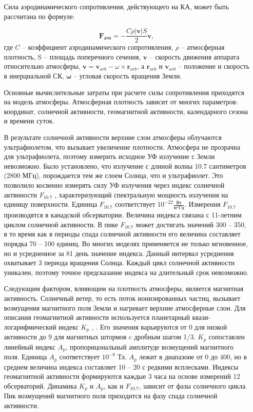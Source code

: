 Сила аэродинамического сопротивления, действующего на КА, может быть рассчитана по формуле:

\begin{equation*}
    \mathbf{F}_{\text{атм}} = - \frac{C \rho |\mathbf{v}| S}{2} \mathbf{v},
\end{equation*}
где $C$ -- коэффициент аэродинамического сопротивления, $\rho$ -- атмосферная плотность, 
S -- площадь поперечного сечения, 
$\mathbf{v}$ -- скорость движения аппарата относительно атмосферы, 
$\mathbf{v} = \mathbf{v}_{orb} - \textbf{$\omega$} \times \mathbf{r}_{orb}$, а
$\mathbf{r}_{orb}$ и $\mathbf{v}_{orb}$  -- положение и скорость в инерциальной СК,
$\mathbf{\omega}$ -- угловая скорость вращения Земли.

Основные вычислительные затраты при расчете силы сопротивления приходятся на модель атмосферы.
Атмосферная плотность зависит от многих параметров: координат, солнечной активности,
геомагнитной активности, календарного сезона и времени суток.

В результате солнечной активности верхние слои атмосферы облучаются ультрафиолетом,
что вызывает увеличение плотности. Атмосфера не прозрачна для ультрафиолета,
поэтому измерить исходное УФ излучение с Земли невозможно. Было установлено, что
излучение с длиной волны 10.7 сантиметров (2800 МГц), порождается тем же слоем Солнца, что и
ультрафиолет. Это позволило косвенно измерять силу УФ излучения через индекс
солнечной актвиности $F_{10.7}$ \cite{Tapping2013}, характеризующий спектральную мощность излучения на единицу поверхности. Единица $F_{10.7}$ соответствует
$10^{-22} \frac{\text{Вт}}{\text{м}^2 \text{Гц}}$. 
Измерения $F_{10.7}$ производятся в канадской обсерватории. 
Величина индекса связана с 11-летним циклом солнечной активности. 
В пике $F_{10.7}$ может достигать значений 300 -- 350, в то время как в периоды спада
солнечной активности его величина составляет порядка 70 -- 100 единиц. 
Во многих моделях применяется не только мгновенное, но и усредненное за 81 день значение индекса.
Данный интервал усреднения охватывает 3 периода вращения Солнца. 
Каждый цикл солнечной активности уникален, 
поэтому точное предсказание индекса на длительный срок невозможно.

Следующим фактором, влияющим на плотность атмосферы, является магнитная активность.
Солнечный ветер, то есть поток ионизированных частиц, 
вызывает возмущения магнитного поля Земли и нагревает верхние атмосферные слои.
Для описания геомагнитной активности используется планетарный квази-логарифмический индекс $K_p$
\cite{Bartels1949}, \cite{Matzka2021}.
Его значения варьируются от 0 для низкой активности до 9 для магнитных штормов c дробным шагом 1/3. 
$K_p$ сопоставлен линейный индекс $A_p$, пропорицональный амплитуде возмущений магнитного поля.
Единица $A_p$ соответствует $10^{-9}$ Тл. $A_p$ лежит в диапазоне от 0 до 400, но в среднем величина индекса составляет 10 -- 20 с редкими всплесками.
Индексы геомагнитной активности формируются каждые 3 часа на основе измерений 12 обсерваторий.
Динамика $K_p$ и $A_p$, как и $F_{10.7}$, зависит от фазы солнечного цикла.
Пик возмущений магнитного поля приходится на фазу спада солнечной активности.

